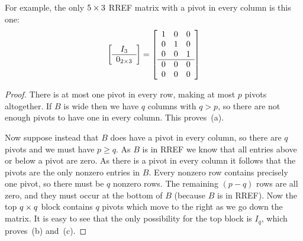 \documentclass[reqno]{amsart}
\theoremstyle{definition}
\begin{document}
For example, the only $5\times 3$ RREF matrix with a pivot in every
column is this one:
\[ \left[\begin{array}{c}
      I_3 \\ \hline 0_{2\times 3} 
   \end{array}\right] =
   \left[\begin{array}{ccc}
    1 & 0 & 0 \\
    0 & 1 & 0 \\
    0 & 0 & 1 \\ \hline
    0 & 0 & 0 \\
    0 & 0 & 0
   \end{array}\right]
\]

\begin{proof}
 There is at most one pivot in every row, making at most $p$ pivots
 altogether.  If $B$ is wide then we have $q$ columns with $q>p$, so
 there are not enough pivots to have one in every column.  This
 proves~(a).

 Now suppose instead that $B$ does have a pivot in every column, so
 there are $q$ pivots and we must have $p\geq q$.  As $B$ is in RREF
 we know that all entries above or below a pivot are zero.  As there
 is a pivot in every column it follows that the pivots are the only
 nonzero entries in $B$.  Every nonzero row contains precisely one
 pivot, so there must be $q$ nonzero rows.  The remaining $(p-q)$ rows
 are all zero, and they must occur at the bottom of $B$ (because $B$
 is in RREF).  Now the top $q\times q$ block contains $q$ pivots which
 move to the right as we go down the matrix.  It is easy to see that
 the only possibility for the top block is $I_q$, which proves~(b)
 and~(c).
\end{proof}
\end{document}
